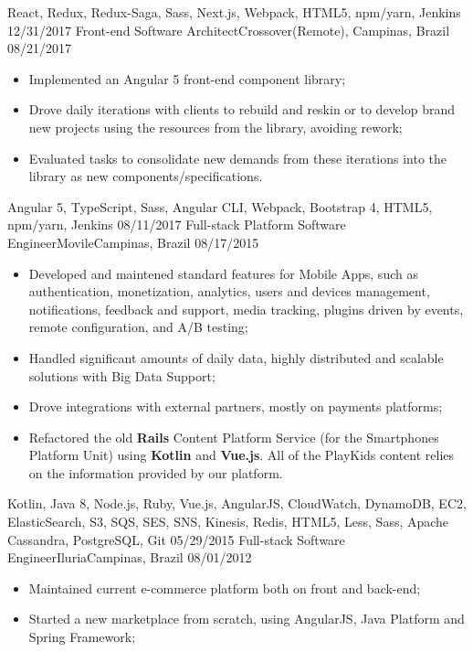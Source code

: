 \begin{experiences}
{}
{React, Redux, Redux-Saga, Sass, Next.js, Webpack, HTML5, npm/yarn, Jenkins}
\emptySeparator
  \experience
    {12/31/2017}   {Front-end Software Architect}{Crossover}{(Remote), Campinas, Brazil}
    {08/21/2017} {
    \begin{itemize}
      \item Implemented an Angular 5 front-end component library;
      \item Drove daily iterations with clients to rebuild and reskin or to develop brand new projects using the resources from the library, avoiding rework;
      \item Evaluated tasks to consolidate new demands from these iterations into the library as new components/specifications.
    \end{itemize}
  }
  {Angular 5, TypeScript, Sass, Angular CLI, Webpack, Bootstrap 4, HTML5, npm/yarn, Jenkins}
  \emptySeparator
  \experience
    {08/11/2017}   {Full-stack Platform Software Engineer}{Movile}{Campinas, Brazil}
    {08/17/2015} {
    \begin{itemize}
      \item Developed and maintened standard features for Mobile Apps, such as authentication,
      monetization, analytics, users and devices management, notifications, feedback and support,
      media tracking, plugins driven by events, remote configuration, and A/B testing;
      \item Handled significant amounts of daily data, highly distributed and scalable solutions with Big Data Support;
      \item Drove integrations with external partners, mostly on payments platforms;
      \item Refactored the old \textbf{Rails} Content Platform Service (for the Smartphones Platform Unit) using \textbf{Kotlin} and \textbf{Vue.js}. All of the PlayKids content relies on the information provided by our platform.
    \end{itemize}
  }
  {Kotlin, Java 8, Node.js, Ruby, Vue.js, AngularJS, CloudWatch, DynamoDB, EC2, ElasticSearch, S3, SQS, SES, SNS, Kinesis, Redis, HTML5, Less, Sass, Apache Cassandra, PostgreSQL, Git}
  \emptySeparator
  \experience
    {05/29/2015} {Full-stack Software Engineer}{Iluria}{Campinas, Brazil}
    {08/01/2012}    {
      \begin{itemize}
        \item Maintained current e-commerce platform both on front and back-end;
        \item Started a new marketplace from scratch, using AngularJS, Java Platform and Spring Framework;

\end{itemize}}
\end{experiences}
